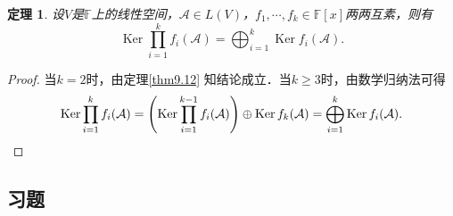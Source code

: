 \documentclass[a4paper,fontset=windows]{ctexbook}
\newtheorem{theorem}{定理}[chapter]
\theoremstyle{definition}
\DeclareMathOperator{\Ker}{Ker}
\renewcommand{\ge}{\geqslant}
\begin{document}
\begin{theorem}\label{thm9.13}
设$V$是$\mathbb{F}$上的线性空间，$\mathcal{A}\in L(V)$，$f_1,\cdots,f_k\in\mathbb{F}[x]$两两互素，则有
$$\Ker\prod_{i=1}^k f_i(\mathcal{A})=\bigoplus_{i=1}^k\Ker f_i(\mathcal{A}).$$
\end{theorem}

\begin{proof}
当$k=2$时，由定理\ref{thm9.12} 知结论成立．当$k\ge 3$时，由数学归纳法可得
\begin{equation*}
\Ker\prod_{i=1}^k f_i(\mathcal{A})=\left(\Ker\prod_{i=1}^{k-1} f_i(\mathcal{A})\right)\oplus\Ker f_k(\mathcal{A})=\bigoplus_{i=1}^k\Ker f_i(\mathcal{A}).\qedhere
\end{equation*}
\end{proof}

\subsection*{习题}
\end{document}
